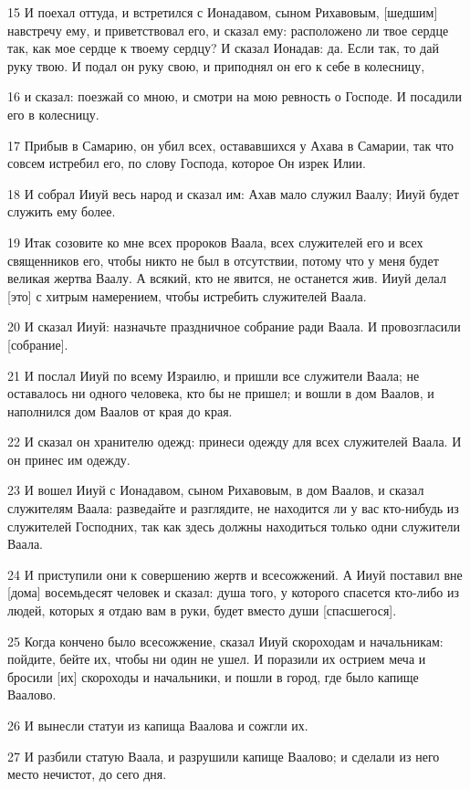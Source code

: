 \par 15 И поехал оттуда, и встретился с Ионадавом, сыном Рихавовым, [шедшим] навстречу ему, и приветствовал его, и сказал ему: расположено ли твое сердце так, как мое сердце к твоему сердцу? И сказал Ионадав: да. Если так, то дай руку твою. И подал он руку свою, и приподнял он его к себе в колесницу,
\par 16 и сказал: поезжай со мною, и смотри на мою ревность о Господе. И посадили его в колесницу.
\par 17 Прибыв в Самарию, он убил всех, остававшихся у Ахава в Самарии, так что совсем истребил его, по слову Господа, которое Он изрек Илии.
\par 18 И собрал Ииуй весь народ и сказал им: Ахав мало служил Ваалу; Ииуй будет служить ему более.
\par 19 Итак созовите ко мне всех пророков Ваала, всех служителей его и всех священников его, чтобы никто не был в отсутствии, потому что у меня будет великая жертва Ваалу. А всякий, кто не явится, не останется жив. Ииуй делал [это] с хитрым намерением, чтобы истребить служителей Ваала.
\par 20 И сказал Ииуй: назначьте праздничное собрание ради Ваала. И провозгласили [собрание].
\par 21 И послал Ииуй по всему Израилю, и пришли все служители Ваала; не оставалось ни одного человека, кто бы не пришел; и вошли в дом Ваалов, и наполнился дом Ваалов от края до края.
\par 22 И сказал он хранителю одежд: принеси одежду для всех служителей Ваала. И он принес им одежду.
\par 23 И вошел Ииуй с Ионадавом, сыном Рихавовым, в дом Ваалов, и сказал служителям Ваала: разведайте и разглядите, не находится ли у вас кто-нибудь из служителей Господних, так как здесь должны находиться только одни служители Ваала.
\par 24 И приступили они к совершению жертв и всесожжений. А Ииуй поставил вне [дома] восемьдесят человек и сказал: душа того, у которого спасется кто-либо из людей, которых я отдаю вам в руки, будет вместо души [спасшегося].
\par 25 Когда кончено было всесожжение, сказал Ииуй скороходам и начальникам: пойдите, бейте их, чтобы ни один не ушел. И поразили их острием меча и бросили [их] скороходы и начальники, и пошли в город, где было капище Ваалово.
\par 26 И вынесли статуи из капища Ваалова и сожгли их.
\par 27 И разбили статую Ваала, и разрушили капище Ваалово; и сделали из него место нечистот, до сего дня.
